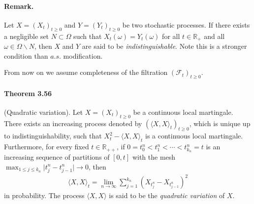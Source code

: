 \documentclass{article}
\numberwithin{equation}{section}
\theoremstyle{plain}
\theoremstyle{definition}
\begin{document}
\paragraph{Remark.} Let $X=(X_t)_{t\geq 0}$ and $Y=(Y_t)_{t\geq 0}$ be two stochastic processes. If there exists a negligible set $N\subset\Omega$ such that $X_t(\omega)=Y_t(\omega)$ for all $t\in\mathbb{R}_+$ and all $\omega\in\Omega\backslash N$, then $X$ and $Y$ are said to be \textit{indistinguishable}. Note this is a stronger condition than $a.s.$ modification.

From now on we assume completeness of the filtration $(\mathscr{F}_t)_{t\geq 0}$.

\paragraph{Theorem 3.56\label{thm:3.56}} (Quadratic variation). Let $X=(X_t)_{t\geq 0}$ be a continuous local martingale. There exists an increasing process denoted by $\left(\langle X,X\rangle_t\right)_{t\geq 0}$, which is unique up to indistinguishability, such that $X_t^2-\langle X,X\rangle_t$ is a continuous local martingale. Furthermore, for every fixed $t\in\mathbb{R}_{++}$, if $0=t_0^n<t_1^n<\cdots<t_{k_n}^n=t$ is an increasing sequence of partitions of $[0,t]$ with the mesh $\max_{1\leq j\leq k_n}\vert t_j^n-t_{j-1}^n\vert\to 0$, then
\begin{align*}
	\langle X,X\rangle_t = \lim_{n\to\infty}\sum_{j=1}^{k_n}\left(X_{t_j^n}-X_{t_{j-1}^n}\right)^2\tag{3.10}\label{eq:3.10}
\end{align*}
in probability. The process $\langle X,X\rangle$ is said to be the \textit{quadratic variation} of $X$.
\end{document}
